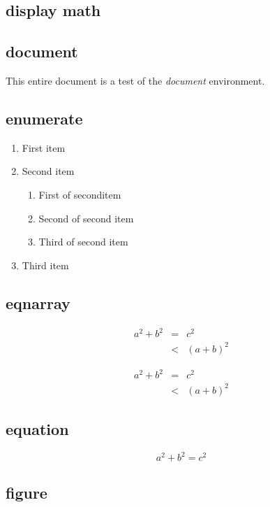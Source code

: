 \documentclass[11pt]{article}
\newcommand{\ifdisco}[2]{#2}
\begin{document}
\subsection{display math}%

\subsection{document}
This entire \ifdisco{page}{document} is a test of the \emph{document} environment.

\subsection{enumerate}
\begin{enumerate}
    \item First item
    \item Second item
        \begin{enumerate}
            \item First of seconditem
            \item Second of second item
            \item Third of second item
        \end{enumerate}

    \item Third item
\end{enumerate}

\subsection{eqnarray}
\begin{eqnarray}
    a^2+b^2 &=& c^2\\
    &<& (a+b)^2
\end{eqnarray}

\begin{eqnarray*}
    a^2+b^2 &=& c^2\\
    &<& (a+b)^2
\end{eqnarray*}

\subsection{equation}
\begin{equation}
    a^2+b^2 = c^2
\end{equation}

\subsection{figure}%
\end{document}
